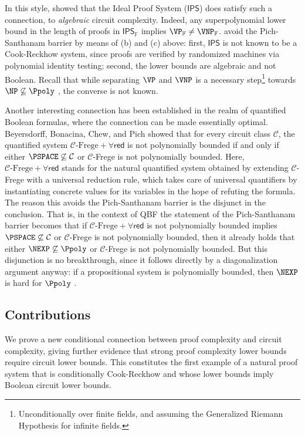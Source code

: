 \documentclass[11pt]{article}
\newcommand{\IPS}{\mathsf{IPS}}
\theoremstyle{definition}
\theoremstyle{plain}
\theoremstyle{remark}
\newcommand{\calC}{\mathcal{C}}
\begin{document}
In this style, \citeauthor{GP18} \cite{GP18} showed that the Ideal Proof System ($\IPS$) does satisfy such a connection, to \emph{algebraic} circuit complexity. Indeed, any superpolynomial lower bound in the length of proofs in $\IPS_{\mathbb{F}}$ implies $\VP_{\mathbb{F}} \neq \VNP_{\mathbb{F}}$. \citeauthor{GP18} avoid the Pich-Santhanam barrier by means of (b) and (c) above: first, $\IPS$ is not known to be a Cook-Reckhow system, since proofs are verified by randomized machines via polynomial identity testing; second, the lower bounds are algebraic and not Boolean. Recall that while separating $\VP$ and $\VNP$ is a necessary step\footnote{Unconditionally over finite fields, and assuming the Generalized Riemann Hypothesis for infinite fields.} towards $\NP \not\subseteq \Ppoly$ \cite{Bur00}, the converse is not known.

Another interesting connection has been established in the realm of quantified Boolean formulas, where the connection can be made essentially optimal. Beyersdorff, Bonacina, Chew, and Pich \cite{BBCP20-QBF} showed that for every circuit class $\calC$, the quantified system $\calC\text{-Frege} + \forall\mathsf{red}$ is not polynomially bounded if and only if either $\PSPACE\not\subseteq \calC$ or $\calC$-Frege is not polynomially bounded. Here, $\calC\text{-Frege} + \forall\mathsf{red}$ stands for the natural quantified system obtained by extending $\calC$-Frege with a universal reduction rule, which takes care of universal quantifiers by instantiating concrete values for its variables in the hope of refuting the formula. The reason this avoids the Pich-Santhanam barrier is the disjunct in the conclusion. That is, in the context of QBF the statement of the Pich-Santhanam barrier becomes that if $\calC\text{-Frege} + \forall\mathsf{red}$ is not polynomially bounded implies $\PSPACE\not\subseteq \calC$ or $\calC$-Frege is not polynomially bounded, then it already holds that either $\NEXP\not\subseteq\Ppoly$ or $\calC$-Frege is not polynomially bounded. But this disjunction is no breakthrough, since it follows directly by a diagonalization argument anyway: if a propositional system is polynomially bounded, then $\NEXP$ is hard for $\Ppoly$ \cite{Kra04-Diag}.

\subsection*{Contributions}
We prove a new conditional connection between proof complexity and circuit complexity, giving further evidence that strong proof complexity lower bounds require circuit lower bounds. This constitutes the first example of a natural proof system that is conditionally Cook-Reckhow and whose lower bounds imply Boolean circuit lower bounds.
\end{document}
